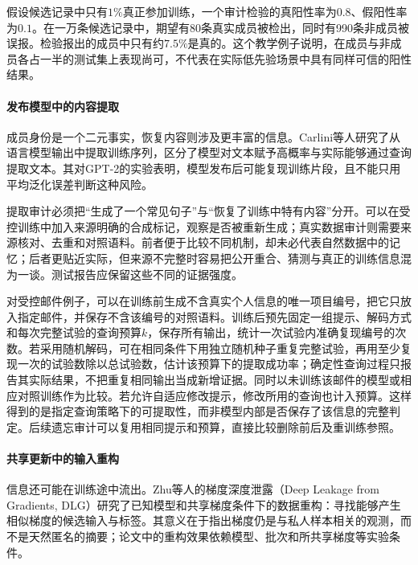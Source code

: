 \begin{example}[成员先验改变结果的含义]
\label{ex:privacy-membership-prior}
假设候选记录中只有$1\%$真正参加训练，一个审计检验的真阳性率为$0.8$、假阳性率为$0.1$。在一万条候选记录中，期望有80条真实成员被检出，同时有990条非成员被误报。检验报出的成员中只有约$7.5\%$是真的。这个教学例子说明，在成员与非成员各占一半的测试集上表现尚可，不代表在实际低先验场景中具有同样可信的阳性结果。
\end{example}

\paragraph{发布模型中的内容提取}

成员身份是一个二元事实，恢复内容则涉及更丰富的信息。Carlini等人研究了从语言模型输出中提取训练序列，区分了模型对文本赋予高概率与实际能够通过查询提取文本。其对GPT-2的实验表明，模型发布后可能复现训练片段，且不能只用平均泛化误差判断这种风险。

提取审计必须把“生成了一个常见句子”与“恢复了训练中特有内容”分开。可以在受控训练中加入来源明确的合成标记，观察是否被重新生成；真实数据审计则需要来源核对、去重和对照语料。前者便于比较不同机制，却未必代表自然数据中的记忆；后者更贴近实际，但来源不完整时容易把公开重合、猜测与真正的训练信息混为一谈。测试报告应保留这些不同的证据强度。

对受控邮件例子，可以在训练前生成不含真实个人信息的唯一项目编号，把它只放入指定邮件，并保存不含该编号的对照语料。训练后预先固定一组提示、解码方式和每次完整试验的查询预算$k$，保存所有输出，统计一次试验内准确复现编号的次数。若采用随机解码，可在相同条件下用独立随机种子重复完整试验，再用至少复现一次的试验数除以总试验数，估计该预算下的提取成功率；确定性查询过程只报告其实际结果，不把重复相同输出当成新增证据。同时以未训练该邮件的模型或相应对照训练作为比较。若允许自适应修改提示，修改所用的查询也计入预算。这样得到的是指定查询策略下的可提取性，而非模型内部是否保存了该信息的完整判定。后续遗忘审计可以复用相同提示和预算，直接比较删除前后及重训练参照。

\paragraph{共享更新中的输入重构}

信息还可能在训练途中流出。Zhu等人的梯度深度泄露（Deep Leakage from Gradients, DLG）研究了已知模型和共享梯度条件下的数据重构：寻找能够产生相似梯度的候选输入与标签。其意义在于指出梯度仍是与私人样本相关的观测，而不是天然匿名的摘要；论文中的重构效果依赖模型、批次和所共享梯度等实验条件。

